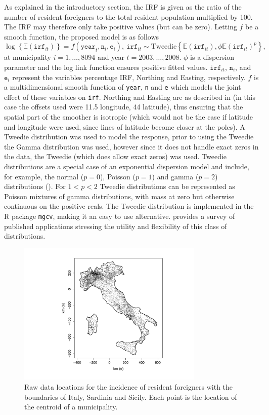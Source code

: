 As explained in the introductory section, the IRF is given as the ratio of the number of resident foreigners to the total resident population multiplied by 100. The IRF may therefore only take positive values (but can be zero). Letting $f$ be a smooth function, the proposed model is as follows
\begin{equation}
\log \left\{\mathbb{E}(\texttt{irf}_{it})\right\} = f(\texttt{year}_t,\texttt{n}_i,\texttt{e}_i), \ \texttt{irf}_{it} \sim \text{Tweedie}\left\{\mathbb{E}(\texttt{irf}_{it}),\phi \mathbb{E}(\texttt{irf}_{it})^{p}\right\},          
\label{PropM}
\end{equation}
at municipality $i=1,\ldots,8094$ and year $t=2003,\ldots,2008$. $\phi$ is a dispersion parameter and the log link function ensures positive fitted values. $\texttt{irf}_{it}$, $\texttt{n}_i$, and $\texttt{e}_i$ represent the variables percentage IRF, Northing and Easting, respectively. $f$ is a multidimensional smooth function of \texttt{year}, \texttt{n} and \texttt{e} which models the joint effect of these variables on \texttt{irf}. Northing and Easting are as described in  (in this case the offsets used were 11.5 longitude, 44 latitude), thus ensuring that the spatial part of the smoother is isotropic (which would not be the case if latitude and longitude were used, since lines of latitude become closer at the poles). A Tweedie distribution was used to model the response, prior to using the Tweedie the Gamma distribution was used, however since it does not handle exact zeros in the data, the Tweedie (which does allow exact zeros) was used. Tweedie distributions are a special case of an exponential dispersion model and include, for example, the normal ($p=0$), Poisson ($p=1$) and gamma ($p=2$) distributions (\cite{Jorgensen}). For $1<p<2$ Tweedie distributions can be represented as Poisson mixtures of gamma distributions, with mass at zero but otherwise continuous on the positive reals. The Tweedie distribution is implemented in the \textsf{R} package \texttt{mgcv}, making it an easy to use alternative.  provides a survey of published applications stressing the utility and flexibility of this class of distributions. 

\begin{figure}[tb]
	\centering
		\includegraphics[width=3.5in]{it/pointmap.pdf}
	\caption{Raw data locations for the incidence of resident foreigners with the boundaries of Italy, Sardinia and Sicily. Each point is the location of the centroid of a municipality.}
	\label{pointmap}
\end{figure}

